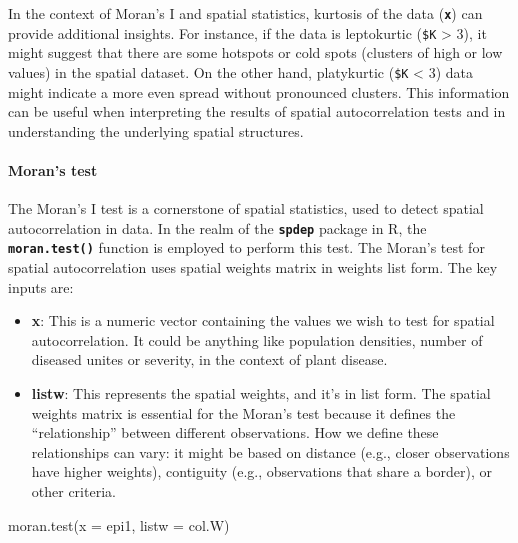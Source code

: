 \documentclass[
  letterpaper,
]{book}
\let\oldparagraph\paragraph
\renewcommand{\paragraph}[1]{\oldparagraph{#1}\mbox{}}
\newenvironment{Shaded}{\begin{snugshade}}{\end{snugshade}}
\newcommand{\AttributeTok}[1]{\textcolor[rgb]{0.40,0.45,0.13}{#1}}
\newcommand{\FunctionTok}[1]{\textcolor[rgb]{0.28,0.35,0.67}{#1}}
\newcommand{\NormalTok}[1]{\textcolor[rgb]{0.00,0.23,0.31}{#1}}
\begin{document}
In the context of Moran's I and spatial statistics, kurtosis of the data
(\textbf{\texttt{x}}) can provide additional insights. For instance, if
the data is leptokurtic (\texttt{\$K} \textgreater{} 3), it might
suggest that there are some hotspots or cold spots (clusters of high or
low values) in the spatial dataset. On the other hand, platykurtic
(\texttt{\$K} \textless{} 3) data might indicate a more even spread
without pronounced clusters. This information can be useful when
interpreting the results of spatial autocorrelation tests and in
understanding the underlying spatial structures.

\hypertarget{morans-test}{%
\paragraph{Moran's test}\label{morans-test}}

The Moran's I test is a cornerstone of spatial statistics, used to
detect spatial autocorrelation in data. In the realm of the
\textbf{\texttt{spdep}} package in R, the \textbf{\texttt{moran.test()}}
function is employed to perform this test. The Moran's test for spatial
autocorrelation uses spatial weights matrix in weights list form. The
key inputs are:

\begin{itemize}
\item
  \textbf{x}: This is a numeric vector containing the values we wish to
  test for spatial autocorrelation. It could be anything like population
  densities, number of diseased unites or severity, in the context of
  plant disease.
\item
  \textbf{listw}: This represents the spatial weights, and it's in list
  form. The spatial weights matrix is essential for the Moran's test
  because it defines the ``relationship'' between different
  observations. How we define these relationships can vary: it might be
  based on distance (e.g., closer observations have higher weights),
  contiguity (e.g., observations that share a border), or other
  criteria.
\end{itemize}

\begin{Shaded}
\begin{Highlighting}[]
\FunctionTok{moran.test}\NormalTok{(}\AttributeTok{x =}\NormalTok{ epi1, }
           \AttributeTok{listw =}\NormalTok{ col.W)}
\end{Highlighting}
\end{Shaded}
\end{document}
